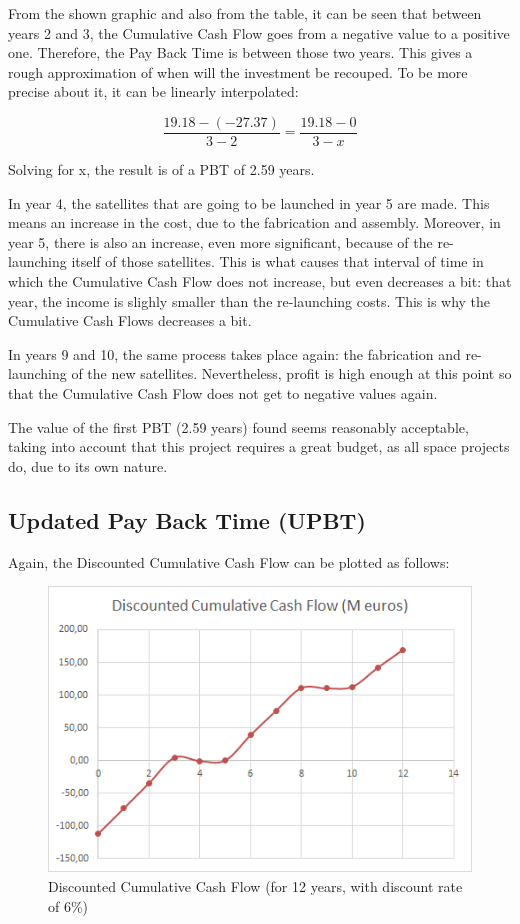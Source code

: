 From the shown graphic and also from the table, it can be seen that between years 2 and 3, the Cumulative Cash Flow goes from a negative value to a positive one. Therefore, the Pay Back Time is between those two years. This gives a rough approximation of when will the investment be recouped. To be more precise about it, it can be linearly interpolated:

\begin{equation}
\frac{19.18-(-27.37)}{3-2}=\frac{19.18-0}{3-x}
\end{equation}

Solving for x, the result is of a PBT of 2.59 years.

In year 4, the satellites that are going to be launched in year 5 are made. This means an increase in the cost, due to the fabrication and assembly. Moreover, in year 5, there is also an increase, even more significant, because of the re-launching itself of those satellites. This is what causes that interval of time in which the Cumulative Cash Flow does not increase, but even decreases a bit: that year, the income is slighly smaller than the re-launching costs. This is why the Cumulative Cash Flows decreases a bit.

In years 9 and 10, the same process takes place again: the fabrication and re-launching of the new satellites. Nevertheless, profit is high enough at this point so that the Cumulative Cash Flow does not get to negative values again. 

The value of the first PBT (2.59 years) found seems reasonably acceptable, taking into account that this project requires a great budget, as all space projects do, due to its own nature. 

\subsection{Updated Pay Back Time (UPBT)}
Again, the Discounted Cumulative Cash Flow can be plotted as follows:

\begin{figure}[H]
	\centering
	\includegraphics{DCCF.png}
	\caption[Discounted Cumulative Cash Flow]{Discounted Cumulative Cash Flow (for 12 years, with discount rate of 6\%)}
\end{figure}

